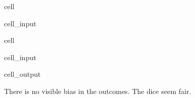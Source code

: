 \documentclass[letterpaper,10pt,english]{jupyterBook}
\begin{document}
\begin{sphinxuseclass}{cell}\begin{sphinxVerbatimInput}

\begin{sphinxuseclass}{cell_input}
\begin{sphinxVerbatim}[commandchars=\\\{\}]
\end{sphinxVerbatim}

\end{sphinxuseclass}\end{sphinxVerbatimInput}

\end{sphinxuseclass}
\begin{sphinxuseclass}{cell}\begin{sphinxVerbatimInput}

\begin{sphinxuseclass}{cell_input}
\begin{sphinxVerbatim}[commandchars=\\\{\}]
\end{sphinxVerbatim}

\end{sphinxuseclass}\end{sphinxVerbatimInput}
\begin{sphinxVerbatimOutput}

\begin{sphinxuseclass}{cell_output}
\noindent{}

\end{sphinxuseclass}\end{sphinxVerbatimOutput}

\end{sphinxuseclass}
\sphinxAtStartPar
There is no visible bias in the outcomes. The dice seem fair.
\end{document}
